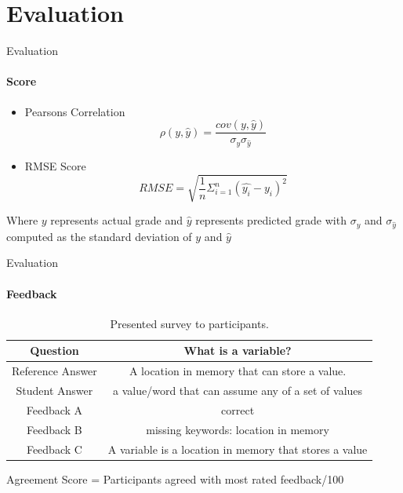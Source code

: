 \documentclass[aspectratio=169]{beamer}
\begin{document}
\section{Evaluation}
\begin{frame}{Evaluation}
	\framesubtitle{Score}
	\begin{itemize}
		\item Pearsons Correlation
		\begin{equation}
		\label{equation:pearson correlation}
		\rho(y,\hat{y}) = \frac{cov(y,\hat{y})}{\sigma_y \sigma_{\hat{y}}}
		\end{equation}
		\item RMSE Score
		\begin{equation}
		\label{equation:Root mean square error}
		RMSE = \sqrt{\frac{1}{n}\Sigma_{i=1}^n(\hat{y_i} - y_i)^2}
		\end{equation}
	\end{itemize}
Where $y$ represents actual grade and $\hat{y}$ represents predicted grade with $\sigma_y$ and $\sigma_{\hat{y}}$ computed as the standard deviation of $y$ and $\hat{y}$
\end{frame}
\begin{frame}{Evaluation}
\framesubtitle{Feedback}
\begin{table}
	\begin{center}
		\begin{tabular}{ |c|c| }
			\hline
			Question & What is a variable?  
			\\ \hline 
			Reference Answer & A location in memory that can store a value.
			\\ \hline
			Student Answer & a value/word that can assume any of a set of values
			\\ \hline
			Feedback A & correct
			\\ \hline
			Feedback B & missing keywords: location in memory
			\\ \hline
			Feedback C & A variable is a location in memory that stores a value
			\\ \hline
		\end{tabular}
		\caption{Presented survey to participants.}
		\label{table:language models}
	\end{center}
\end{table}

Agreement Score = Participants agreed with most rated feedback/100
\end{frame}
\end{document}
